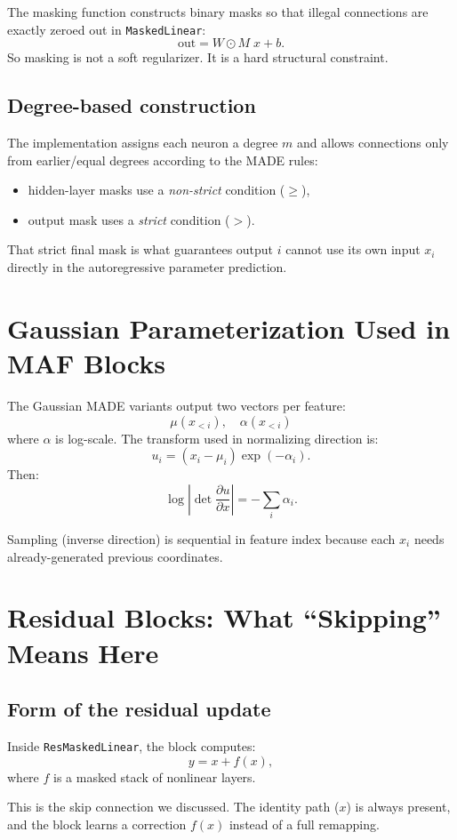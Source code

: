\documentclass[11pt]{article}
\begin{document}
The masking function constructs binary masks so that illegal connections are
exactly zeroed out in \texttt{MaskedLinear}:
\[
\text{out} = W \odot M \; x + b.
\]
So masking is not a soft regularizer. It is a hard structural constraint.

\subsection*{Degree-based construction}
The implementation assigns each neuron a degree $m$ and allows connections only
from earlier/equal degrees according to the MADE rules:
\begin{itemize}[leftmargin=*]
\item hidden-layer masks use a \emph{non-strict} condition ($\ge$),
\item output mask uses a \emph{strict} condition ($>$).
\end{itemize}

That strict final mask is what guarantees output $i$ cannot use its own input
$x_i$ directly in the autoregressive parameter prediction.

\section{Gaussian Parameterization Used in MAF Blocks}
The Gaussian MADE variants output two vectors per feature:
\[
\mu(x_{<i}),\quad \alpha(x_{<i})
\]
where $\alpha$ is log-scale. The transform used in normalizing direction is:
\[
u_i = (x_i - \mu_i)\exp(-\alpha_i).
\]
Then:
\[
\log\left|\det\frac{\partial u}{\partial x}\right| = -\sum_i \alpha_i.
\]

Sampling (inverse direction) is sequential in feature index because each
$x_i$ needs already-generated previous coordinates.

\section{Residual Blocks: What ``Skipping'' Means Here}
\subsection*{Form of the residual update}
Inside \texttt{ResMaskedLinear}, the block computes:
\[
y = x + f(x),
\]
where $f$ is a masked stack of nonlinear layers.

This is the skip connection we discussed. The identity path ($x$) is always
present, and the block learns a correction $f(x)$ instead of a full remapping.
\end{document}
